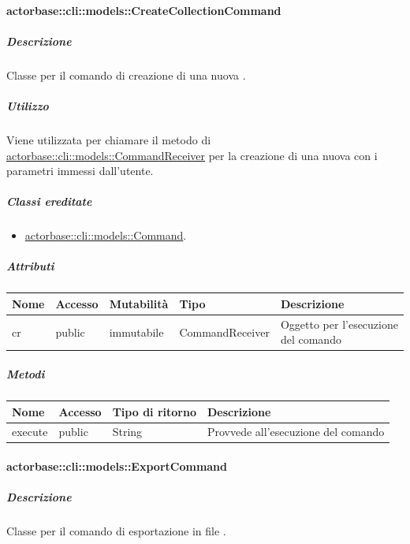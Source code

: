 \documentclass{scalatekids-article}
\begin{document}
\paragraph{actorbase::cli::models::CreateCollectionCommand}
\label{sec:actorbase::cli::models::CreateCollectionCommand}

\subparagraph{Descrizione}

Classe per il comando di creazione di una nuova .

\subparagraph{Utilizzo}

Viene utilizzata per chiamare il metodo di
\hyperref[sec:actorbase::cli::models::CommandReceiver]{actorbase::cli::models::CommandReceiver} per la creazione di una nuova
 con i parametri immessi dall'utente.

\subparagraph{Classi ereditate}

\begin{itemize}
\item \hyperref[sec:actorbase::cli::models::Command]{actorbase::cli::models::Command}.
\end{itemize}

\subparagraph{Attributi}

\begin{tabular}{| p{1cm} | p{1.5cm} | p{2cm} | p{4cm} | p{8.5cm} |}
  \hline
  Nome & Accesso & Mutabilità & Tipo & Descrizione\\
  \hline
  cr & public & immutabile & CommandReceiver & Oggetto per l'esecuzione del comando\\
  \hline
\end{tabular}

\subparagraph{Metodi}

\begin{tabular}{| l | l | l | l |}
  \hline
  Nome & Accesso & Tipo di ritorno & Descrizione\\
  \hline
  execute & public & String & Provvede all'esecuzione del comando\\
  \hline
\end{tabular}

\paragraph{actorbase::cli::models::ExportCommand}
\label{sec:actorbase::cli::models::ExportCommand}

\subparagraph{Descrizione}

Classe per il comando di esportazione in file .
\end{document}
